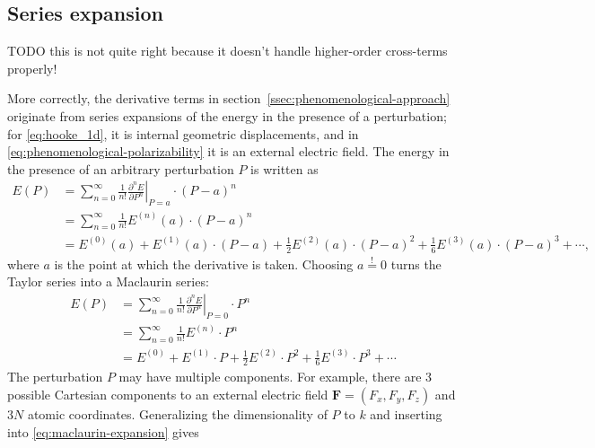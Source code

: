 \documentclass[%
class = book,%
crop = false,%
float = true,%
multi = true,%
preview = false,%
]{standalone}
\begin{document}
\subsection{Series expansion}
\label{ssec:series-expansion}
TODO this is not quite right because it doesn't handle higher-order cross-terms properly!

More correctly, the derivative terms in section~\ref{ssec:phenomenological-approach} originate from series expansions of the energy in the presence of a perturbation; for \eqref{eq:hooke_1d}, it is internal geometric displacements, and in \eqref{eq:phenomenological-polarizability} it is an external electric field. The energy in the presence of an arbitrary perturbation \(P\) is written as
\begin{equation}
  \label{eq:taylor-expansion}
  \begin{aligned}
    E(P) &= \sum_{n = 0}^{\infty} \frac{1}{n!} \left. \frac{\partial^{n} E}{\partial P^{n}} \right|_{P = a} \cdot (P - a)^{n} \\
    &= \sum_{n = 0}^{\infty} \frac{1}{n!} E^{(n)}(a) \cdot (P - a)^{n} \\
    &= E^{(0)}(a) + E^{(1)}(a) \cdot (P - a) + \frac{1}{2} E^{(2)}(a) \cdot (P - a)^{2} + \frac{1}{6} E^{(3)}(a) \cdot (P - a)^{3} + \cdots ,
  \end{aligned}
\end{equation}
where \(a\) is the point at which the derivative is taken. Choosing \(a \overset{!}{=} 0\) turns the Taylor series into a Maclaurin series:
\begin{equation}
  \label{eq:maclaurin-expansion}
  \begin{aligned}
    E(P) &= \sum_{n = 0}^{\infty} \frac{1}{n!} \left. \frac{\partial^{n} E}{\partial P^{n}} \right|_{P = 0} \cdot P^{n} \\
    &= \sum_{n = 0}^{\infty} \frac{1}{n!} E^{(n)} \cdot P^{n} \\
    &= E^{(0)} + E^{(1)} \cdot P + \frac{1}{2} E^{(2)} \cdot P^{2} + \frac{1}{6} E^{(3)} \cdot P^{3} + \cdots
  \end{aligned}
\end{equation}
The perturbation \(P\) may have multiple components. For example, there are 3 possible Cartesian components to an external electric field \(\mathbf{F} = (F_{x}, F_{y}, F_{z})\) and \(3N\) atomic coordinates. Generalizing the dimensionality of \(P\) to \(k\) and inserting into \eqref{eq:maclaurin-expansion} gives
\end{document}
